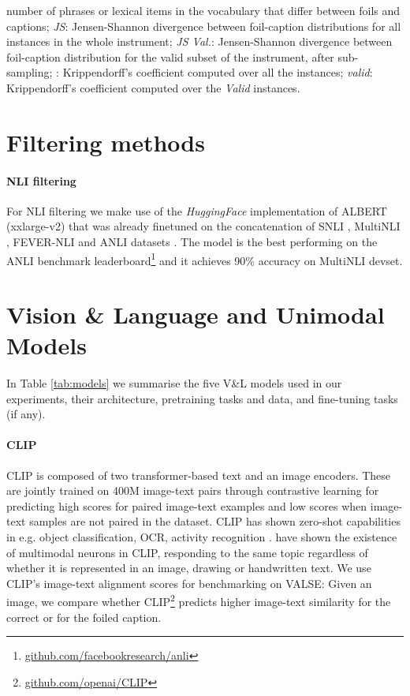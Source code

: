 \documentclass[11pt]{article}
\newcommand{\dataset}{VALSE}
\begin{document}
\begin{table*}[!t]
{    number of phrases or lexical items in the vocabulary that differ between foils and captions; {\em JS}: Jensen-Shannon divergence between foil-caption distributions for all instances in the whole instrument; {\em JS Val.}: Jensen-Shannon divergence between foil-caption distribution for the valid subset of the instrument, after sub-sampling; {\em }: Krippendorff's  coefficient computed over all the instances; {\em  valid}: Krippendorff's  coefficient computed over the {\em Valid} instances.}
    \label{tab:mturk-results}
\end{table*} 


\section{Filtering methods}\label{app:filtering}

\paragraph{NLI filtering} For NLI filtering we make use of the \textit{HuggingFace} \cite{wolf2020transformers} implementation of ALBERT (xxlarge-v2) that was already finetuned on the concatenation of SNLI \cite{bowman2015large}, MultiNLI \cite{williams2017broad}, FEVER-NLI \cite{nie2019combining} and ANLI datasets \cite{nie2019adversarial}. The model is the best performing on the ANLI benchmark leaderboard\footnote{\url{github.com/facebookresearch/anli}} and it achieves 90\% accuracy on MultiNLI devset.


\section{Vision \& Language and Unimodal Models}\label{app:models}

In Table \ref{tab:models} we summarise the five V\&L models used in our experiments, their architecture, pretraining tasks and data, and fine-tuning tasks (if any).

\paragraph{CLIP}
CLIP \cite{radford2021learning} is composed of two transformer-based text and an image encoders. These are jointly trained on 400M image-text pairs through contrastive learning for predicting high scores for paired image-text examples and low scores when image-text samples are not paired in the dataset. CLIP has shown zero-shot capabilities in e.g. object classification, OCR, activity recognition \cite{radford2021learning}. \citet{goh2021multimodal} have shown the existence of multimodal neurons in CLIP, responding to the same topic regardless of whether it is represented in an image, drawing or handwritten text. We use CLIP's image-text alignment scores for benchmarking on \dataset{}: Given an image, we compare whether CLIP\footnote{\url{github.com/openai/CLIP}} 
predicts higher image-text similarity for the correct or for the foiled caption.
\end{document}
